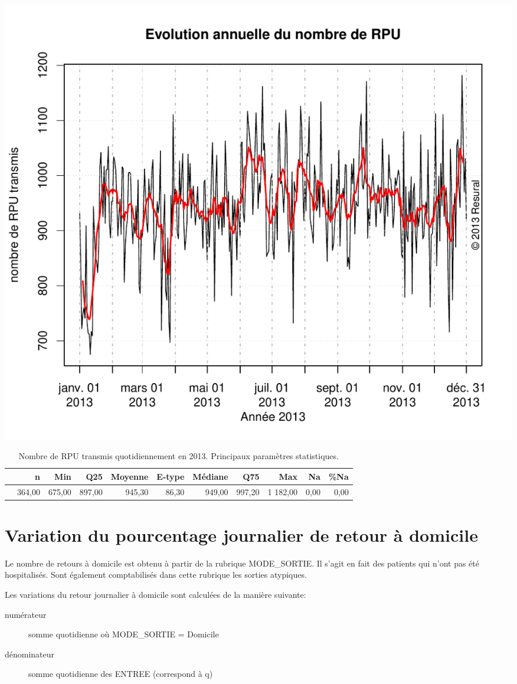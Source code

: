 \documentclass[12pt,english,french,twoside]{book}\usepackage[]{graphicx}\usepackage[]{color}
\makeatletter
\def\maxwidth{ %
  \ifdim\Gin@nat@width>\linewidth
    \linewidth
  \else
    \Gin@nat@width
  \fi
}
\makeatother
\begin{document}
\includegraphics[width=\maxwidth]{figure/passages_totaux-1} 
\begin{table}[ht]
\centering
\begin{tabular}{rrrrrrrrrrr}
  \hline
 & n & Min & Q25 & Moyenne & E-type & Médiane & Q75 & Max & Na & \%Na \\ 
  \hline
 & 364,00 & 675,00 & 897,00 & 945,30 & 86,30 & 949,00 & 997,20 & 1 182,00 & 0,00 & 0,00 \\ 
   \hline
\end{tabular}
\caption[Passages totaux]{Nombre de RPU transmis quotidiennement en 2013. Principaux paramètres statistiques.} 
\label{tab:pt}
\end{table}



\section{Variation du pourcentage journalier de retour à domicile}


Le nombre de retours à domicile est obtenu à partir de la rubrique MODE\_SORTIE. Il s'agit en fait des patients qui n'ont pas été hospitalisés. Sont également comptabilisés dans cette rubrique les sorties atypiques.

Les variations du retour journalier à domicile sont calculées de la manière suivante:
\begin{description}
  \item[numérateur] somme quotidienne où MODE\_SORTIE = Domicile
  \item[dénominateur] somme quotidienne des ENTREE (correspond à q)
\end{description}
\end{document}
